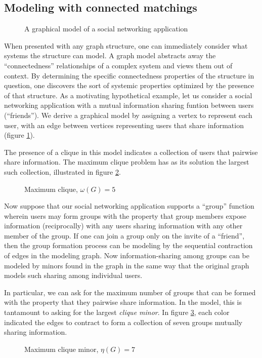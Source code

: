 \documentclass[12pt]{article}
\theoremstyle{definition}
\begin{document}
\subsection{Modeling with connected matchings}
\begin{figure}[h]
\begin{center}\end{center}
\caption{A graphical model of a social networking application}
\label{soc_net}
\end{figure}
When presented with any graph structure, one can immediately consider what systems the structure can model.  A graph model abstracts away the ``connectedness'' relationships of a complex system and views them out of context.  By determining the specific connectedness properties of the structure in question, one discovers the sort of systemic properties optimized by the presence of that structure. As a motivating hypothetical example, let us consider a social networking application with a mutual information sharing funtion between users (``friends'').  We derive a graphical model by assigning a vertex to represent each user, with an edge between vertices representing users that share information (figure \ref{soc_net}).

The presence of a clique in this model indicates a collection of users that pairwise share information.  The maximum clique problem has as its solution the largest such collection, illustrated in figure \ref{soc_net_clique}.
\begin{figure}[h]
\begin{center}\end{center}
\caption{Maximum clique, $\omega(G) = 5$}
\label{soc_net_clique}
\end{figure}  

Now suppose that our social networking application supports a ``group'' function wherein users may form groups with the property that group members expose information (reciprocally) with any users sharing information with any other member of the group.  If one can join a group only on the invite of a ``friend'', then the group formation process can be modeling by the sequential contraction of edges in the modeling graph.  Now information-sharing among groups can be modeled by minors found in the graph in the same way that the original graph models such sharing among individual users.

In particular, we can ask for the maximum number of groups that can be formed with the property that they pairwise share information.  In the model, this is tantamount to asking for the largest \textit{clique minor}.  In figure \ref{soc_net_minor}, each color indicated the edges to contract to form a collection of seven groups mutually sharing information.
\begin{figure}[h]
\begin{center}\end{center}
\caption{Maximum clique minor, $\eta(G) = 7$}
\label{soc_net_minor}
\end{figure} 
\end{document}
